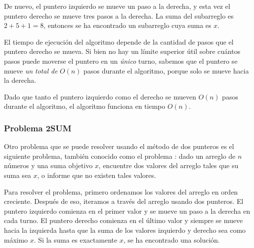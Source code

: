 De nuevo, el puntero izquierdo se mueve un paso a la derecha,
y esta vez el puntero derecho se mueve tres
pasos a la derecha.
La suma del subarreglo es $2+5+1=8$, entonces se ha encontrado un subarreglo
cuya suma es $x$.

\begin{center}
\end{center}

El tiempo de ejecución del algoritmo depende de
la cantidad de pasos que el puntero derecho se mueva.
Si bien no hay un límite superior útil sobre cuántos pasos puede
moverse el puntero en un \emph{único} turno,
sabemos que el puntero se mueve \emph{un total de}
$O(n)$ pasos durante el algoritmo,
porque solo se mueve hacia la derecha.

Dado que tanto el puntero izquierdo como el derecho
se mueven $O(n)$ pasos durante el algoritmo,
el algoritmo funciona en tiempo $O(n)$.

\subsubsection{Problema 2SUM}


Otro problema que se puede resolver usando
el método de dos punteros es el siguiente problema,
también conocido como el problema :
dado un arreglo de $n$ números y
una suma objetivo $x$, encuentre
dos valores del arreglo tales que su suma sea $x$,
o informe que no existen tales valores.

Para resolver el problema, primero
ordenamos los valores del arreglo en orden creciente.
Después de eso, iteramos a través del arreglo usando
dos punteros.
El puntero izquierdo comienza en el primer valor
y se mueve un paso a la derecha en cada turno.
El puntero derecho comienza en el último valor
y siempre se mueve hacia la izquierda hasta que la suma de los
valores izquierdo y derecho sea como máximo $x$.
Si la suma es exactamente $x$,
se ha encontrado una solución.

